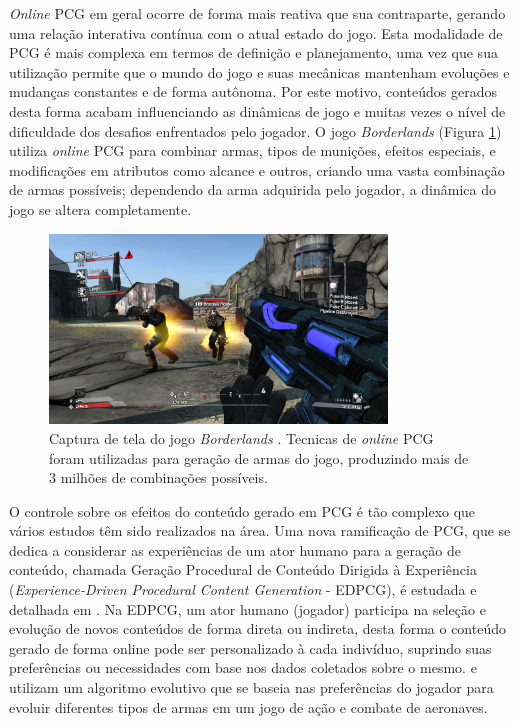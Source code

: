 \emph{Online} PCG em geral ocorre de forma mais reativa que sua contraparte, gerando uma relação interativa contínua com o atual estado do jogo. Esta modalidade de PCG é mais complexa em termos de definição e planejamento, uma vez que sua utilização permite que o mundo do jogo e suas mecânicas mantenham evoluções e mudanças constantes e de forma autônoma. Por este motivo, conteúdos gerados desta forma acabam influenciando as dinâmicas de jogo e muitas vezes o nível de dificuldade dos desafios enfrentados pelo jogador. O jogo \emph{Borderlands} \cite{game:borderlands} (Figura \ref{fig:game_borderlands}) utiliza \emph{online} PCG para combinar armas, tipos de munições, efeitos especiais, e modificações em atributos como alcance e outros, criando uma vasta combinação de armas possíveis; dependendo da arma adquirida pelo jogador, a dinâmica do jogo se altera completamente.

\begin{figure}[htb]
	\begin{center}
		\includegraphics[width=0.8\textwidth]{Imagens/game_borderlands.jpg}
		\caption{Captura de tela do jogo \emph{Borderlands} \cite{game:borderlands}. Tecnicas de \emph{online} PCG foram utilizadas para geração de armas do jogo, produzindo mais de 3 milhões de combinações possíveis.}
		\label{fig:game_borderlands}
	\end{center}
\end{figure}

O controle sobre os efeitos do conteúdo gerado em PCG é tão complexo que vários estudos têm sido realizados na área. Uma nova ramificação de PCG, que se dedica a considerar as experiências de um ator humano para a geração de conteúdo, chamada Geração Procedural de Conteúdo Dirigida à Experiência (\emph{Experience-Driven Procedural Content Generation} - EDPCG), é estudada e detalhada em \cite{yannakakis2011experience}. Na EDPCG, um ator humano (jogador) participa na seleção e evolução de novos conteúdos de forma direta ou indireta, desta forma o conteúdo gerado de forma online pode ser personalizado à cada indivíduo, suprindo suas preferências ou necessidades com base nos dados coletados sobre o mesmo. \cite{hastings2009evolving} e \cite{hastings2009automatic} utilizam um algoritmo evolutivo que se baseia nas preferências do jogador para evoluir diferentes tipos de armas em um jogo de ação e combate de aeronaves.

